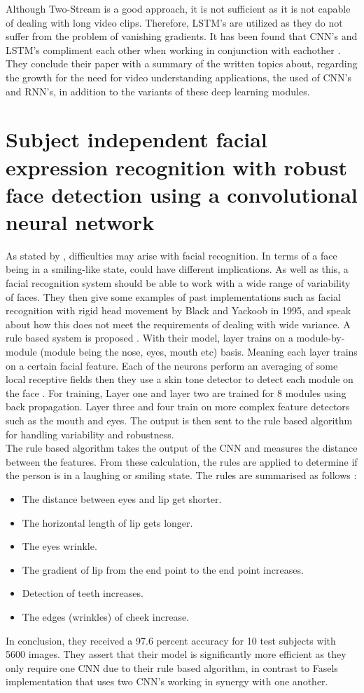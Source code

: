 Although Two-Stream is a good approach, it is not sufficient as it is not capable of dealing with long video clips. Therefore, LSTM's are utilized as they do not suffer from the problem of vanishing gradients. It has been found that CNN's and LSTM's compliment each other when working in conjunction with eachother \citep{Wu}. They conclude their paper with a summary of the written topics about, regarding the growth for the need for video understanding applications, the used of CNN's and RNN's, in addition to the variants of these deep learning modules. 

\section{Subject independent facial expression recognition with robust face detection using a convolutional neural network}
As stated by \citeauthor{MATSUGU}, difficulties may arise with facial recognition. In terms of a face being in a smiling-like state, could have different implications. As well as this, a facial recognition system should be able to work with a wide range of variability of faces. They then give some examples of past implementations such as facial recognition with rigid head movement by Black and Yackoob in 1995, and speak about how this does not meet the requirements of dealing with wide variance. A rule based system is proposed \citep{MATSUGU}. With their model, layer trains on a module-by-module (module being the nose, eyes, mouth etc) basis. Meaning each layer trains on a certain facial feature. Each of the neurons perform an averaging of some local receptive fields then they use a skin tone detector to detect each module on the face \citep{MATSUGU}. For training, Layer one and layer two are trained for 8 modules using back propagation. Layer three and four train on more complex feature detectors such as the mouth and eyes. The output is then sent to the rule based algorithm for handling variability and robustness. \\
The rule based algorithm takes the output of the CNN and measures the distance between the features. From these calculation, the rules are applied to determine if the person is in a laughing or smiling state. The rules are summarised as follows \citep{MATSUGU}:
\begin{itemize}
	\item The distance between eyes and lip get shorter.
	\item The horizontal length of lip gets longer.
	\item The eyes wrinkle.
	\item The gradient of lip from the end point to the end point increases.
	\item Detection of teeth increases.
	\item The edges (wrinkles) of cheek increase.
\end{itemize}
In conclusion, they received a 97.6 percent accuracy for 10 test subjects with 5600 images. They assert that their model is significantly more efficient as they only require one CNN due to their rule based algorithm, in contrast to Fasels implementation that uses two CNN's working in synergy with one another.

